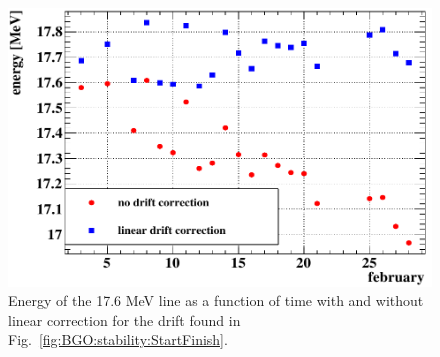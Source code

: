 \begin{refsection}
\begin{figure}
    \centering
    \includegraphics[width=0.9\linewidth]{Figures//X17//BGO/BGO_correction.png}
    \caption[BGO: linear correction to the energy]{Energy of the 17.6 MeV line as a function of time with and without linear correction for the drift found in Fig.~\ref{fig:BGO:stability:StartFinish}.}
    \label{fig:BGO:correction}
\end{figure}


\end{refsection}
